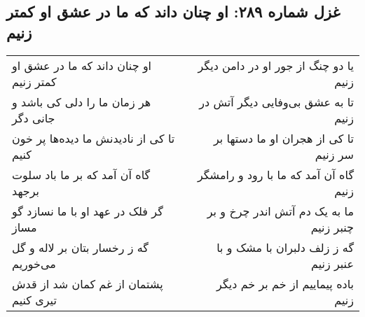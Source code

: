 \begin{center}
\section*{غزل شماره ۲۸۹: او چنان داند که ما در عشق او کمتر زنیم}
\label{sec:289}
\begin{longtable}{l p{0.5cm} r}
او چنان داند که ما در عشق او کمتر زنیم
&&
یا دو چنگ از جور او در دامن دیگر زنیم
\\
هر زمان ما را دلی کی باشد و جانی دگر
&&
تا به عشق بی‌وفایی دیگر آتش در زنیم
\\
تا کی از نادیدنش ما دیده‌ها پر خون کنیم
&&
تا کی از هجران او ما دستها بر سر زنیم
\\
گاه آن آمد که بر ما باد سلوت برجهد
&&
گاه آن آمد که ما با رود و رامشگر زنیم
\\
گر فلک در عهد او با ما نسازد گو مساز
&&
ما به یک دم آتش اندر چرخ و بر چنبر زنیم
\\
گه ز رخسار بتان بر لاله و گل می‌خوریم
&&
گه ز زلف دلبران با مشک و با عنبر زنیم
\\
پشتمان از غم کمان شد از قدش تیری کنیم
&&
باده پیماییم از خم بر خم دیگر زنیم
\\
\end{longtable}
\end{center}
